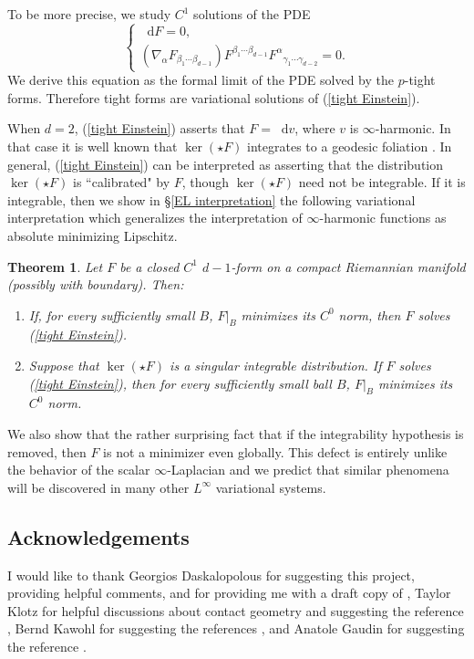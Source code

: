 \documentclass[reqno,11pt]{amsart}
\newcommand*\dif{\mathop{}\!\mathrm{d}}
\newtheorem{mainthm}{Theorem}
\theoremstyle{definition}
\numberwithin{equation}{section}
\begin{document}
To be more precise, we study $C^1$ solutions of the PDE 
\begin{equation}\label{tight Einstein}
\begin{cases}\dif F = 0, \\
	(\nabla_\alpha F_{\beta_1 \cdots \beta_{d - 1}}) F^{\beta_1 \cdots \beta_{d - 1}} {F^\alpha}_{\gamma_1 \cdots \gamma_{d - 2}} = 0.
\end{cases}
\end{equation}
We derive this equation as the formal limit of the PDE solved by the $p$-tight forms.
Therefore tight forms are variational solutions of (\ref{tight Einstein}).

When $d = 2$, (\ref{tight Einstein}) asserts that $F = \dif v$, where $v$ is $\infty$-harmonic.
In that case it is well known that $\ker(\star F)$ integrates to a geodesic foliation \cite[Proof of Theorem 1.5]{Sheffield12}.
In general, (\ref{tight Einstein}) can be interpreted as asserting that the distribution $\ker(\star F)$ is ``calibrated" by $F$, though $\ker(\star F)$ need not be integrable.
If it is integrable, then we show in \S\ref{EL interpretation} the following variational interpretation which generalizes the interpretation of $\infty$-harmonic functions as absolute minimizing Lipschitz.

\begin{mainthm}\label{tight are absolute minimizers}
Let $F$ be a closed $C^1$ $d - 1$-form on a compact Riemannian manifold (possibly with boundary). Then:
\begin{enumerate}
\item If, for every sufficiently small $B$, $F|_B$ minimizes its $C^0$ norm, then $F$ solves (\ref{tight Einstein}).
\item Suppose that $\ker(\star F)$ is a singular integrable distribution. If $F$ solves (\ref{tight Einstein}), then for every sufficiently small ball $B$, $F|_B$ minimizes its $C^0$ norm.
\end{enumerate}
\end{mainthm}

We also show that the rather surprising fact that if the integrability hypothesis is removed, then $F$ is not a minimizer even globally.
This defect is entirely unlike the behavior of the scalar $\infty$-Laplacian and we predict that similar phenomena will be discovered in many other $L^\infty$ variational systems.

\subsection{Acknowledgements}
I would like to thank Georgios Daskalopolous for suggesting this project, providing helpful comments, and for providing me with a draft copy of \cite{daskalopoulos2023}, Taylor Klotz for helpful discussions about contact geometry and suggesting the reference \cite{Peralta_Salas_2023}, Bernd Kawohl for suggesting the references \cite{Kawohl2003, Grieser05}, and Anatole Gaudin for suggesting the reference \cite{Costabel2010}.
\end{document}
